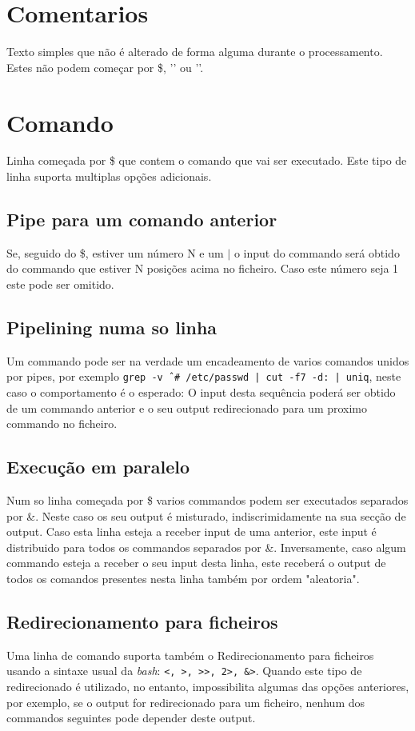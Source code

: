 \documentclass[12pt,a4paper]{report}
\begin{document}
    \section{Comentarios}
        Texto simples que não é alterado de forma alguma durante o
        processamento. Estes não podem começar por \$, '\outputStart' ou
        '\outputEnd'.
    \section{Comando}
        Linha começada por \$ que contem o comando que vai ser executado.
        Este tipo de linha suporta multiplas opções adicionais.
        \subsection{Pipe para um comando anterior}
            Se, seguido do \$, estiver um número N e um $|$ o input do commando
            será obtido do commando que estiver N posições acima no ficheiro.
            Caso este número seja 1 este pode ser omitido.
        \subsection{Pipelining numa so linha}
            Um commando pode ser na verdade um encadeamento de varios comandos
            unidos por pipes, por exemplo
            \texttt{grep -v ˆ# /etc/passwd | cut -f7 -d: | uniq},
            neste caso o comportamento é o esperado: O input desta sequência
            poderá ser obtido de um commando anterior e o seu output
            redirecionado para um proximo commando no ficheiro.
        \subsection{Execução em paralelo}
            Num so linha começada por \$ varios commandos podem ser executados
            separados por \&. Neste caso os seu output é misturado,
            indiscrimidamente na sua secção de output. Caso esta linha esteja
            a receber input de uma anterior, este input é distribuido para
            todos os commandos separados por \&. Inversamente, caso algum
            commando esteja a receber o seu input desta linha, este receberá
            o output de todos os comandos presentes nesta linha também por
            ordem "aleatoria".
        \subsection{Redirecionamento para ficheiros}
            Uma linha de comando suporta também o Redirecionamento para
            ficheiros usando a sintaxe usual da \textit{bash}:
            \texttt{<, >, >>, 2>, &>}.
            Quando este tipo de redirecionado é utilizado, no entanto,
            impossibilita algumas das opções anteriores, por exemplo,
            se o output for redirecionado para um ficheiro, nenhum dos commandos
            seguintes pode depender deste output.
\end{document}
